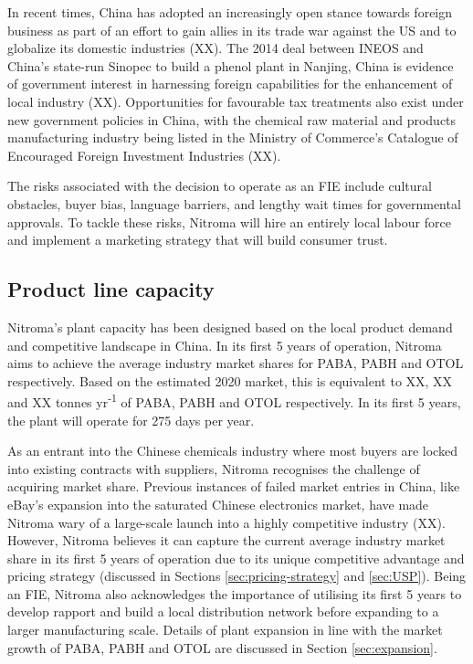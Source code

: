 In recent times, China has adopted an increasingly open stance towards foreign business as part of an effort to gain allies in its trade war against the US and to globalize its domestic industries (XX). The 2014 deal between INEOS and China’s state-run Sinopec to build a phenol plant in Nanjing, China is evidence of government interest in harnessing foreign capabilities for the enhancement of local industry (XX). Opportunities for favourable tax treatments also exist under new government policies in China, with the chemical raw material and products manufacturing industry being listed in the Ministry of Commerce’s Catalogue of Encouraged Foreign Investment Industries (XX). 

The risks associated with the decision to operate as an FIE include cultural obstacles, buyer bias, language barriers, and lengthy wait times for governmental approvals. To tackle these risks, Nitroma will hire an entirely local labour force and implement a marketing strategy that will build consumer trust.

\subsection{Product line capacity}
\label{sec:product-capacity}
Nitroma’s plant capacity has been designed based on the local product demand and competitive landscape in China. In its first 5 years of operation, Nitroma aims to achieve the average industry market shares for PABA, PABH and OTOL respectively. Based on the estimated 2020 market, this is equivalent to XX, XX and XX tonnes yr\textsuperscript{-1} of PABA, PABH and OTOL respectively. In its first 5 years, the plant will operate for 275 days per year.

As an entrant into the Chinese chemicals industry where most buyers are locked into existing contracts with suppliers, Nitroma recognises the challenge of acquiring market share. Previous instances of failed market entries in China, like eBay’s expansion into the saturated Chinese electronics market, have made Nitroma wary of a large-scale launch into a highly competitive industry (XX). However, Nitroma believes it can capture the current average industry market share in its first 5 years of operation due to its unique competitive advantage and pricing strategy (discussed in Sections \ref{sec:pricing-strategy} and \ref{sec:USP}). Being an FIE, Nitroma also acknowledges the importance of utilising its first 5 years to develop rapport and build a local distribution network before expanding to a larger manufacturing scale. Details of plant expansion in line with the market growth of PABA, PABH and OTOL are discussed in Section \ref{sec:expansion}.

